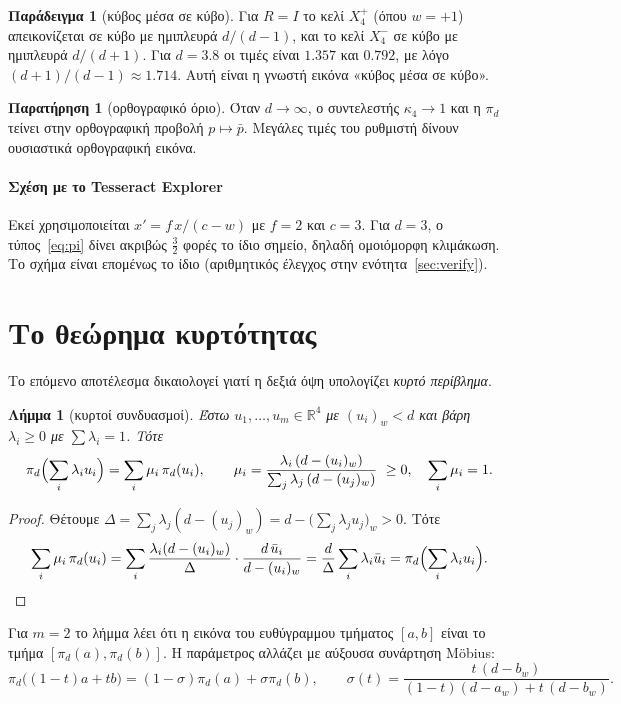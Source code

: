\documentclass[10pt,a4paper]{article}
\theoremstyle{plain}
\newtheorem{lemma}[theorem]{Λήμμα}
\theoremstyle{definition}
\newtheorem{remark}[theorem]{Παρατήρηση}
\newtheorem{example}[theorem]{Παράδειγμα}
\newcommand{\R}{\mathbb{R}}
\newcommand{\eng}[1]{\textenglish{#1}}
\begin{document}
\begin{example}[κύβος μέσα σε κύβο]
Για $R=I$ το κελί $X_4^{+}$ (όπου $w=+1$) απεικονίζεται σε κύβο με ημιπλευρά $d/(d-1)$, και το κελί $X_4^{-}$ σε κύβο με ημιπλευρά $d/(d+1)$. Για $d=3.8$ οι τιμές είναι $1.357$ και $0.792$, με λόγο $(d+1)/(d-1)\approx1.714$. Αυτή είναι η γνωστή εικόνα «κύβος μέσα σε κύβο».
\end{example}

\begin{remark}[ορθογραφικό όριο]
Όταν $d\to\infty$, ο συντελεστής $\kappa_4\to1$ και η $\pi_d$ τείνει στην ορθογραφική προβολή $p\mapsto\bar p$. Μεγάλες τιμές του ρυθμιστή δίνουν ουσιαστικά ορθογραφική εικόνα.
\end{remark}

\paragraph{Σχέση με το \eng{Tesseract Explorer}} Εκεί χρησιμοποιείται $x'=f\,x/(c-w)$ με $f=2$ και $c=3$. Για $d=3$, ο τύπος~\eqref{eq:pi} δίνει ακριβώς $\tfrac{3}{2}$ φορές το ίδιο σημείο, δηλαδή ομοιόμορφη κλιμάκωση. Το σχήμα είναι επομένως το ίδιο (αριθμητικός έλεγχος στην ενότητα~\ref{sec:verify}).

\section{Το θεώρημα κυρτότητας}
Το επόμενο αποτέλεσμα δικαιολογεί γιατί η δεξιά όψη υπολογίζει \emph{κυρτό περίβλημα}.

\begin{lemma}[κυρτοί συνδυασμοί]\label{lem:combo}
Έστω $u_1,\dots,u_m\in\R^4$ με $(u_i)_w<d$ και βάρη $\lambda_i\ge0$ με $\sum\lambda_i=1$. Τότε
\[
\pi_d\Bigl(\sum_i\lambda_iu_i\Bigr)=\sum_i\mu_i\,\pi_d(u_i),\qquad
\mu_i=\frac{\lambda_i\,(d-(u_i)_w)}{\sum_j\lambda_j\,(d-(u_j)_w)}\ \ge0,\quad \sum_i\mu_i=1 .
\]
\end{lemma}
\begin{proof}
Θέτουμε $\Delta=\sum_j\lambda_j(d-(u_j)_w)=d-\bigl(\sum_j\lambda_ju_j\bigr)_w>0$. Τότε
\[
\sum_i\mu_i\,\pi_d(u_i)=\sum_i\frac{\lambda_i(d-(u_i)_w)}{\Delta}\cdot\frac{d\,\bar u_i}{d-(u_i)_w}
=\frac{d}{\Delta}\sum_i\lambda_i\bar u_i=\pi_d\Bigl(\sum_i\lambda_iu_i\Bigr). \qedhere
\]
\end{proof}
Για $m=2$ το λήμμα λέει ότι η εικόνα του ευθύγραμμου τμήματος $[a,b]$ είναι το τμήμα $[\pi_d(a),\pi_d(b)]$. Η παράμετρος αλλάζει με αύξουσα συνάρτηση \eng{Möbius}:
\begin{equation}\label{eq:mobius}
\pi_d\bigl((1-t)a+tb\bigr)=(1-\sigma)\pi_d(a)+\sigma\pi_d(b),\qquad
\sigma(t)=\frac{t\,(d-b_w)}{(1-t)(d-a_w)+t\,(d-b_w)} .
\end{equation}
\end{document}
